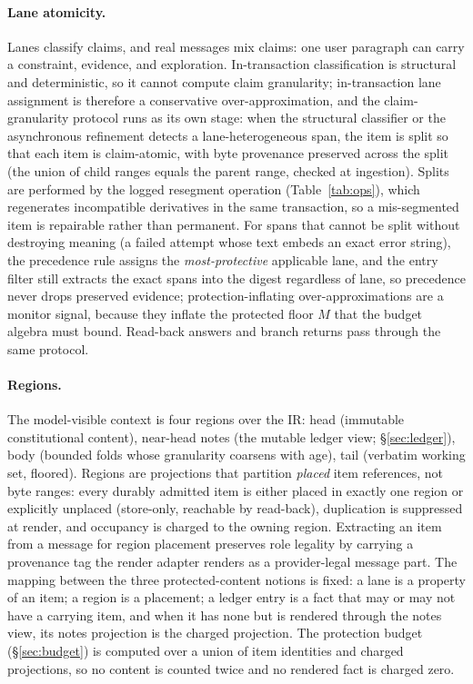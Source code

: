 \documentclass[11pt]{article}
\begin{document}
\paragraph{Lane atomicity.} Lanes classify claims, and real messages mix claims: one user paragraph can carry a constraint, evidence, and exploration. In-transaction classification is structural and deterministic, so it cannot compute claim granularity; in-transaction lane assignment is therefore a conservative over-approximation, and the claim-granularity protocol runs as its own stage: when the structural classifier or the asynchronous refinement detects a lane-heterogeneous span, the item is split so that each item is claim-atomic, with byte provenance preserved across the split (the union of child ranges equals the parent range, checked at ingestion). Splits are performed by the logged resegment operation (Table~\ref{tab:ops}), which regenerates incompatible derivatives in the same transaction, so a mis-segmented item is repairable rather than permanent. For spans that cannot be split without destroying meaning (a failed attempt whose text embeds an exact error string), the precedence rule assigns the \emph{most-protective} applicable lane, and the entry filter still extracts the exact spans into the digest regardless of lane, so precedence never drops preserved evidence; protection-inflating over-approximations are a monitor signal, because they inflate the protected floor $M$ that the budget algebra must bound. Read-back answers and branch returns pass through the same protocol.

\paragraph{Regions.} The model-visible context is four regions over the IR: head (immutable constitutional content), near-head notes (the mutable ledger view; \S\ref{sec:ledger}), body (bounded folds whose granularity coarsens with age), tail (verbatim working set, floored). Regions are projections that partition \emph{placed} item references, not byte ranges: every durably admitted item is either placed in exactly one region or explicitly unplaced (store-only, reachable by read-back), duplication is suppressed at render, and occupancy is charged to the owning region. Extracting an item from a message for region placement preserves role legality by carrying a provenance tag the render adapter renders as a provider-legal message part. The mapping between the three protected-content notions is fixed: a lane is a property of an item; a region is a placement; a ledger entry is a fact that may or may not have a carrying item, and when it has none but is rendered through the notes view, its notes projection is the charged projection. The protection budget (\S\ref{sec:budget}) is computed over a union of item identities and charged projections, so no content is counted twice and no rendered fact is charged zero.
\end{document}
